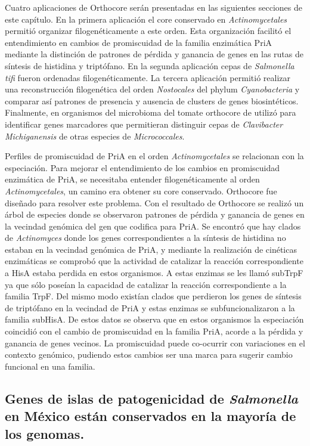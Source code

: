 \documentclass[12pt,twoside]{reedthesis}
\begin{document}
  Cuatro aplicaciones de Orthocore serán presentadas en las siguientes
  secciones de este capítulo. En la primera aplicación el core conservado
  en \emph{Actinomycetales} permitió organizar filogenéticamente a este
  orden. Esta organización facilitó el entendimiento en cambios de
  promiscuidad de la familia enzimática PriA mediante la distinción de
  patrones de pérdida y ganancia de genes en las rutas de síntesis de
  histidina y triptófano. En la segunda aplicación cepas de
  \emph{Salmonella tifi} fueron ordenadas filogenéticamente. La tercera
  aplicación permitió realizar una reconstrucción filogenética del orden
  \emph{Nostocales} del phylum \emph{Cyanobacteria} y comparar así
  patrones de presencia y ausencia de clusters de genes biosintéticos.
  Finalmente, en organismos del microbioma del tomate orthocore de utilizó
  para identificar genes marcadores que permitieran distinguir cepas de
  \emph{Clavibacter Michiganensis} de otras especies de
  \emph{Micrococcales}.
  
  Perfiles de promiscuidad de PriA en el orden \emph{Actinomycetales} se
  relacionan con la especiación. Para mejorar el entendimiento de los
  cambios en promiscuidad enzimática de PriA, se necesitaba entender
  filogenéticamente al orden \emph{Actinomycetales}, un camino era obtener
  su core conservado. Orthocore fue diseñado para resolver este problema.
  Con el resultado de Orthocore se realizó un árbol de especies donde se
  observaron patrones de pérdida y ganancia de genes en la vecindad
  genómica del gen que codifica para PriA. Se encontró que hay clados de
  \emph{Actinomyces} donde los genes correspondientes a la síntesis de
  histidina no estaban en la vecindad genómica de PriA, y mediante la
  realización de cinéticas enzimáticas se comprobó que la actividad de
  catalizar la reacción correspondiente a HisA estaba perdida en estos
  organismos. A estas enzimas se les llamó subTrpF ya que sólo poseían la
  capacidad de catalizar la reacción correspondiente a la familia TrpF.
  Del mismo modo existían clados que perdieron los genes de síntesis de
  triptófano en la vecindad de PriA y estas enzimas se subfuncionalizaron
  a la familia subHisA. De estos datos se observa que en estos organismos
  la especiación coincidió con el cambio de promiscuidad en la familia
  PriA, acorde a la pérdida y ganancia de genes vecinos. La promiscuidad
  puede co-ocurrir con variaciones en el contexto genómico, pudiendo estos
  cambios ser una marca para sugerir cambio funcional en una familia.
  
  \subsection{\texorpdfstring{Genes de islas de patogenicidad de
  \emph{Salmonella} en México están conservados en la mayoría de los
  genomas.}{Genes de islas de patogenicidad de Salmonella en México están conservados en la mayoría de los genomas.}}\label{genes-de-islas-de-patogenicidad-de-salmonella-en-mexico-estan-conservados-en-la-mayoria-de-los-genomas.}
  
\end{document}
